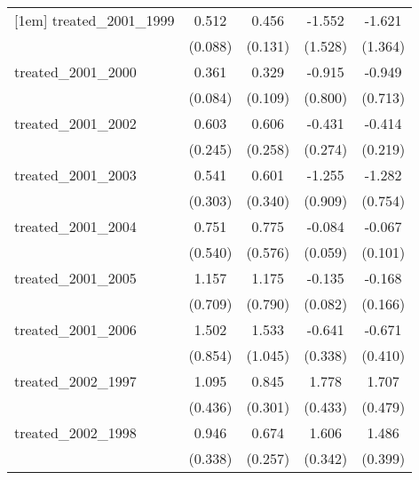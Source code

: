 {\begin{tabular}{l*{4}{c}}
[1em]
treated\_2001\_1999&       0.512\sym{***}&       0.456\sym{***}&      -1.552         &      -1.621         \\
            &     (0.088)         &     (0.131)         &     (1.528)         &     (1.364)         \\
[1em]
treated\_2001\_2000&       0.361\sym{***}&       0.329\sym{**} &      -0.915         &      -0.949         \\
            &     (0.084)         &     (0.109)         &     (0.800)         &     (0.713)         \\
[1em]
treated\_2001\_2002&       0.603\sym{*}  &       0.606\sym{*}  &      -0.431         &      -0.414         \\
            &     (0.245)         &     (0.258)         &     (0.274)         &     (0.219)         \\
[1em]
treated\_2001\_2003&       0.541         &       0.601         &      -1.255         &      -1.282         \\
            &     (0.303)         &     (0.340)         &     (0.909)         &     (0.754)         \\
[1em]
treated\_2001\_2004&       0.751         &       0.775         &      -0.084         &      -0.067         \\
            &     (0.540)         &     (0.576)         &     (0.059)         &     (0.101)         \\
[1em]
treated\_2001\_2005&       1.157         &       1.175         &      -0.135         &      -0.168         \\
            &     (0.709)         &     (0.790)         &     (0.082)         &     (0.166)         \\
[1em]
treated\_2001\_2006&       1.502         &       1.533         &      -0.641         &      -0.671         \\
            &     (0.854)         &     (1.045)         &     (0.338)         &     (0.410)         \\
[1em]
treated\_2002\_1997&       1.095\sym{*}  &       0.845\sym{**} &       1.778\sym{***}&       1.707\sym{***}\\
            &     (0.436)         &     (0.301)         &     (0.433)         &     (0.479)         \\
[1em]
treated\_2002\_1998&       0.946\sym{**} &       0.674\sym{**} &       1.606\sym{***}&       1.486\sym{***}\\
            &     (0.338)         &     (0.257)         &     (0.342)         &     (0.399)         \\

\end{tabular}}
